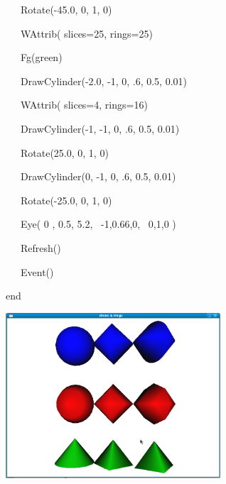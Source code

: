\documentclass[letterpaper]{article}
\begin{document}
{\sffamily
\ \ \ Rotate(-45.0, 0, 1, 0)}


\bigskip

{\sffamily
\ \ \ WAttrib( {\textquotedbl}slices=25{\textquotedbl}, {\textquotedbl}rings=25{\textquotedbl}) \ \ }

{\sffamily
\ \ \ Fg({\textquotedbl}green{\textquotedbl}) \ }

{\sffamily
\ \ \ DrawCylinder(-2.0, -1, 0, .6, 0.5, 0.01)}


\bigskip

{\sffamily
\ \ \ WAttrib( {\textquotedbl}slices=4{\textquotedbl}, {\textquotedbl}rings=16{\textquotedbl}) \ \ }

{\sffamily
\ \ \ DrawCylinder(-1, -1, 0, .6, 0.5, 0.01)}


\bigskip

{\sffamily
\ \ \ Rotate(25.0, 0, 1, 0)}

{\sffamily
\ \ \ DrawCylinder(0, -1, 0, .6, 0.5, 0.01)}

{\sffamily
\ \ \ Rotate(-25.0, 0, 1, 0)}

{\sffamily
\ \ \ Eye( 0 , 0.5, 5.2, \ {}-1,0.66,0, \ 0,1,0 )}

{\sffamily
\ \ \ Refresh()}

{\sffamily
\ \ \ Event()}

{\sffamily
end}


\bigskip



\begin{center}
\includegraphics[width=3.148in,height=2.4299in]{utr9/utr9-img022.png}
\end{center}
\end{document}
